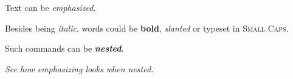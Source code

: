 \documentclass{article}
\begin{document}
{\sffamily
Text can be {\em emphasized}.

Besides being {\itshape italic}, words could be {\bfseries bold},
{\slshape slanted} or typeset in {\scshape Small Caps}.

Such commands can be {\itshape\bfseries nested}.}

{\em See how {\em emphasizing} looks when nested.}
\end{document}
